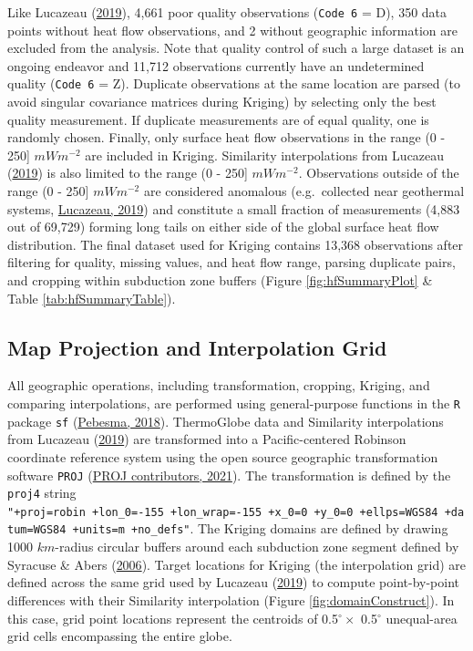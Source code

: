 Like Lucazeau (\protect\hyperlink{ref-lucazeau2019}{2019}), 4,661 poor quality observations (\texttt{Code\ 6} = D), 350 data points without heat flow observations, and 2 without geographic information are excluded from the analysis. Note that quality control of such a large dataset is an ongoing endeavor and 11,712 observations currently have an undetermined quality (\texttt{Code\ 6} = Z). Duplicate observations at the same location are parsed (to avoid singular covariance matrices during Kriging) by selecting only the best quality measurement. If duplicate measurements are of equal quality, one is randomly chosen. Finally, only surface heat flow observations in the range (0 - 250{]} \(mWm^{-2}\) are included in Kriging. Similarity interpolations from Lucazeau (\protect\hyperlink{ref-lucazeau2019}{2019}) is also limited to the range (0 - 250{]} \(mWm^{-2}\). Observations outside of the range (0 - 250{]} \(mWm^{-2}\) are considered anomalous (e.g.~collected near geothermal systems, \protect\hyperlink{ref-lucazeau2019}{Lucazeau, 2019}) and constitute a small fraction of measurements (4,883 out of 69,729) forming long tails on either side of the global surface heat flow distribution. The final dataset used for Kriging contains 13,368 observations after filtering for quality, missing values, and heat flow range, parsing duplicate pairs, and cropping within subduction zone buffers (Figure \ref{fig:hfSummaryPlot} \& Table \ref{tab:hfSummaryTable}).

\hypertarget{map-projection-and-interpolation-grid}{%
\subsection{Map Projection and Interpolation Grid}\label{map-projection-and-interpolation-grid}}

All geographic operations, including transformation, cropping, Kriging, and comparing interpolations, are performed using general-purpose functions in the \texttt{R} package \texttt{sf} (\protect\hyperlink{ref-pebesma2018}{Pebesma, 2018}). ThermoGlobe data and Similarity interpolations from Lucazeau (\protect\hyperlink{ref-lucazeau2019}{2019}) are transformed into a Pacific-centered Robinson coordinate reference system using the open source geographic transformation software \texttt{PROJ} (\protect\hyperlink{ref-proj2021}{PROJ contributors, 2021}). The transformation is defined by the \texttt{proj4} string \texttt{"+proj=robin\ +lon\_0=-155\ +lon\_wrap=-155\ +x\_0=0\ +y\_0=0\ +ellps=WGS84\ +datum=WGS84\ +units=m\ +no\_defs"}. The Kriging domains are defined by drawing 1000 \(km\)-radius circular buffers around each subduction zone segment defined by Syracuse \& Abers (\protect\hyperlink{ref-syracuse2006}{2006}). Target locations for Kriging (the interpolation grid) are defined across the same grid used by Lucazeau (\protect\hyperlink{ref-lucazeau2019}{2019}) to compute point-by-point differences with their Similarity interpolation (Figure \ref{fig:domainConstruct}). In this case, grid point locations represent the centroids of 0.5\(^\circ \times\) 0.5\(^\circ\) unequal-area grid cells encompassing the entire globe.



